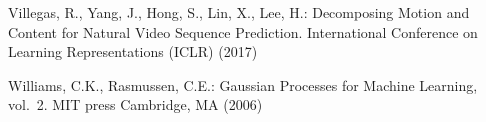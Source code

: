 \documentclass[runningheads]{llncs}
\begin{document}
\begin{thebibliography}{10}
	Villegas, R., Yang, J., Hong, S., Lin, X., Lee, H.: Decomposing {M}otion and
	{C}ontent for {N}atural {V}ideo {S}equence {P}rediction. International
	Conference on Learning Representations (ICLR)  (2017)
	
	Williams, C.K., Rasmussen, C.E.: Gaussian {P}rocesses for {M}achine {L}earning,
	vol.~2. MIT press Cambridge, MA (2006)
	
\end{thebibliography}
\end{document}
